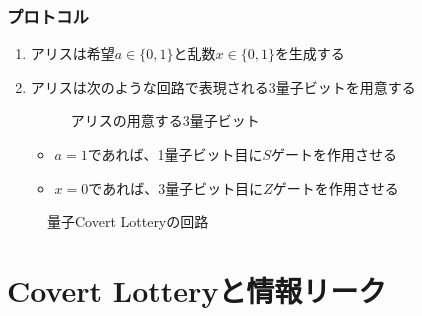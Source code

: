 \begin{frame}
  \frametitle{プロトコル}

  \begin{enumerate}
    \item アリスは希望$a \in \{0, 1\}$と乱数$x \in \{0, 1\}$を生成する

    \item アリスは次のような回路で表現される3量子ビットを用意する
    \begin{figure}
      \centering
      \caption{アリスの用意する3量子ビット}
    \end{figure}
    \begin{itemize}
      \item $a = 1$であれば、1量子ビット目に$S$ゲートを作用させる
      \item $x = 0$であれば、3量子ビット目に$Z$ゲートを作用させる
    \end{itemize}

  \end{enumerate}
\end{frame}


\begin{frame}
  \begin{figure}
    \centering
    \caption{量子Covert Lotteryの回路}
  \end{figure}
\end{frame}

\section{Covert Lotteryと情報リーク}


